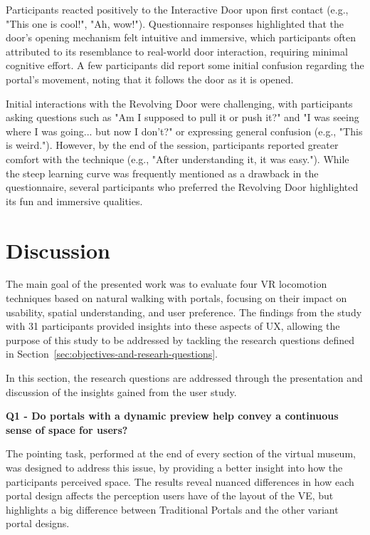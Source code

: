 Participants reacted positively to the Interactive Door upon first contact (e.g., "This one is cool!", "Ah, wow!"). 
Questionnaire responses highlighted that the door's opening mechanism felt intuitive and immersive, which participants often attributed 
to its resemblance to real-world door interaction, requiring minimal cognitive effort. A few participants did report some initial 
confusion regarding the portal's movement, noting that it follows the door as it is opened.

Initial interactions with the Revolving Door were challenging, with participants asking questions such as "Am I supposed to pull 
it or push it?" and "I was seeing where I was going... but now I don't?" or expressing general confusion (e.g., "This is weird."). 
However, by the end of the session, participants reported greater comfort with the technique (e.g., "After understanding it, it was easy.").
While the steep learning curve was frequently mentioned as a drawback in the questionnaire, several participants who preferred the Revolving
Door highlighted its fun and immersive qualities.

\section{Discussion}
\label{sec:discussion}

The main goal of the presented work was to evaluate four \gls{VR} locomotion techniques based on natural walking with portals, 
focusing on their impact on usability, spatial understanding, and user preference. The findings from the study with 31 participants 
provided insights into these aspects of \gls{UX}, allowing the purpose of this study to be addressed by tackling the research questions 
defined in Section~\ref{sec:objectives-and-researh-questions}.

In this section, the research questions are addressed through the presentation and discussion of the insights gained from the user study.

\textbf{Q1 - Do portals with a dynamic preview help convey a continuous sense of space for users?}

The pointing task, performed at the end of every section of the virtual museum, was designed to address this issue, by providing a better 
insight into how the participants perceived space. The results reveal nuanced differences in how each portal design affects the perception 
users have of the layout of the \gls{VE}, but highlights a big difference between Traditional Portals and the other variant portal designs.

